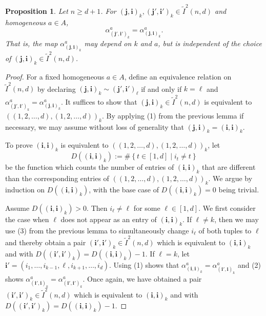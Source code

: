 \documentclass[11pt,reqno]{amsart} %
\newtheorem{proposition}[theorem]{Proposition}
\newcommand{\0}{\bar{0}}
\newcommand{\1}{\bar{1}}
\newcommand{\bi}{\mathbf{i}}
\newcommand{\bj}{\mathbf{j}}
\newcommand{\Itwo}{\tilde{I}^{2}(n,d)}
\numberwithin{equation}{subsection}
\begin{document}
\begin{proposition} \label{L:independence-of-alpha} Let $n \geq d+1$.  For $(\bj, \bi)_{k}, (\bj', \bi')_{k} \in \Itwo$ and homogeneous $a \in A$, 
\[
\alpha_{(\bj', \bi')_{k}}^{a} = \alpha_{(\bj, \bi)_{k}}^{a}.
\]  That is, the map $\alpha_{(\bj, \bi)_{k}}^{a}$ may depend on $k$ and $a$, but is independent of the choice of $(\bj, \bi)_{k} \in \Itwo$.
\end{proposition}
\begin{proof} %

For a fixed homogeneous $a \in A$, define an equivalence relation on $\Itwo$ by declaring $(\bj, \bi)_{k} \sim (\bj', \bi')_{\ell}$ if and only if $k=\ell$ and $\alpha_{(\bj', \bi')_{k}}^{a} = \alpha_{(\bj, \bi)_{k}}^{a}$. It suffices to show that $(\bj, \bi)_{k} \in \Itwo$ is equivalent to $((1,2,\dotsc  ,d),(1,2,\dotsc,d))_{k}$.  By applying (1) from the previous lemma if necessary, we may assume without loss of generality that $(\bj , \bi )_{k} = (\bi, \bi)_{k}$.


To prove $(\bi, \bi)_{k}$ is equivalent to $((1,2,\dotsc  ,d),(1,2,\dotsc,d))_{k}$, let 
\[
D \left((\bi, \bi)_{k}\right) := \# \left\{t \in [1,d] \mid i_{t} \neq t \right\} 
\]  be the function which counts the number of entries of $(\bi, \bi)_{k}$ that are different than the corresponding entries of $((1,2,\dotsc ,d),(1,2,\dotsc,d))_{k}$.  We argue by induction on $D \left((\bi, \bi)_{k}\right)$, with the base case of $D \left((\bi, \bi)_{k}\right)=0$ being trivial.

Assume $D \left((\bi, \bi)_{k}\right) > 0$.  Then $i_{\ell}\neq \ell$ for some $\ell \in [1,d]$.  We first consider the case when $\ell$ does not appear as an entry of $(\bi, \bi)_{k}$.  If $\ell \neq k$, then we may use (3) from the previous lemma to simultaneously change $i_{\ell}$ of both tuples to $\ell$ and thereby obtain a pair $(\bi', \bi')_{k} \in  \Itwo$ which is equivalent to $(\bi, \bi)_{k}$ and with $D((\bi', \bi')_{k}) = D((\bi, \bi)_{k})-1$.  If $\ell = k$, let $\bi'= (i_{1}, \dotsc , i_{k-1}, \ell, i_{k+1}, \dotsc , i_{d})$.  Using (1) shows that $\alpha^{a}_{(\bi, \bi)_{k}}=\alpha^{a}_{(\bi', \bi)_{k}}$  and (2) shows $\alpha^{a}_{(\bi', \bi)_{k}}=\alpha^{a}_{(\bi', \bi')_{k}}$.  Once again, we have obtained a pair $(\bi', \bi')_{k} \in  \Itwo$ which is equivalent to $(\bi, \bi)_{k}$ and with $D((\bi', \bi')_{k}) = D((\bi, \bi)_{k})-1$.  



\end{proof}
\end{document}
